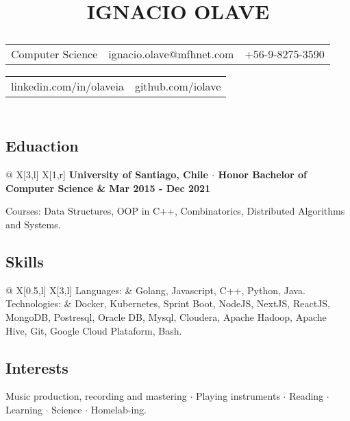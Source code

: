 \documentclass{article}
\author{\vspace{-5ex}}
\date{\vspace{-5ex}}
\title{
    \LARGE IGNACIO OLAVE\\
    \Large{
        \textcolor{gray-5}{ \begin{tabular}{l|l|l}
            Computer Science & ignacio.olave@mfhnet.com & +56-9-8275-3590
        \end{tabular}}

        \textcolor{gray-6}{ \begin{tabular}{l|l}
                linkedin.com/in/olaveia & github.com/iolave
        \end{tabular}}
    }
    \vspace{-8ex}
}
\begin{document}
    \maketitle
    \textcolor{gray-5}{\section*{Eduaction}}

        \begin{tblr}{@{} X[3,l] X[1,r]} 
            \bfseries University of Santiago, Chile $\cdot$ Honor Bachelor of Computer Science & Mar 2015 - Dec 2021
        \end{tblr}
    
        Courses: Data Structures, OOP in C++, Combinatorics, Distributed Algorithms and Systems.


    \textcolor{gray-5}{\section*{Skills}}
        \begin{tblr}{@{} X[0.5,l] X[3,l]}
            Languages:      & Golang, Javascript, C++, Python, Java. \\
            Technologies:   & Docker, Kubernetes, Sprint Boot, NodeJS, NextJS, ReactJS, MongoDB, Postresql, Oracle DB, Mysql, Cloudera, Apache Hadoop, Apache Hive, Git, Google Cloud Plataform, Bash.
        \end{tblr}

    \textcolor{gray-5}{\section*{Interests}}
    Music production, recording and mastering $\cdot$ Playing instruments $\cdot$ Reading $\cdot$ Learning $\cdot$ Science $\cdot$ Homelab-ing.
        
\end{document}
